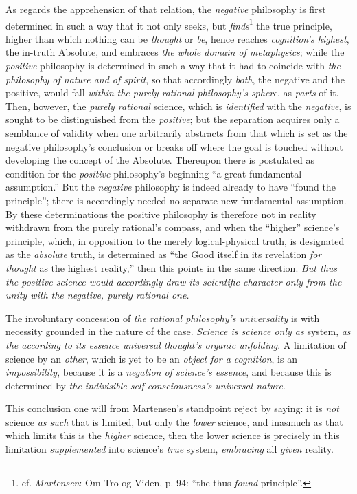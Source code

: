 \documentclass[12pt,a4paper]{book}
\begin{document}
As regards the apprehension of that relation, the \emph{negative} philosophy is first determined
in such a way that it not only seeks, but \emph{finds}\footnote{cf. \emph{Martensen}: Om Tro
og Viden, p. 94: ``the thus-\emph{found} principle''.} the true principle, higher than which
nothing can be \emph{thought} or \emph{be}, hence reaches \emph{cognition's highest}, the in-truth
Absolute, and embraces \emph{the whole domain of metaphysics}; while the \emph{positive}
philosophy is determined in such a way that it had to coincide with \emph{the philosophy of
nature and of spirit}, so that accordingly \emph{both}, the negative and the positive, would fall
\emph{within} \emph{the purely rational philosophy's sphere}, as \emph{parts} of it. Then, however, the
\emph{purely rational} science, which is \emph{identified} with the \emph{negative}, is sought to be
distinguished from the \emph{positive}; but the separation acquires only a semblance of
validity when one arbitrarily abstracts from that which is set as the negative philosophy's
conclusion or breaks off where the goal is touched without developing the concept of the
Absolute. Thereupon there is postulated as condition for the \emph{positive} philosophy's beginning
``a great fundamental assumption.'' But the \emph{negative} philosophy is indeed already to have
``found the principle''; there is accordingly needed no separate new fundamental assumption.
By these determinations the positive philosophy is therefore not in reality withdrawn from the
purely rational's compass, and when the ``higher'' science's principle, which, in opposition to
the merely logical-physical truth, is designated as the \emph{absolute} truth, is determined as ``the
Good itself in its revelation \emph{for thought} as the highest reality,'' then this points in the
same direction. \emph{But thus the positive science would accordingly draw its scientific
character only from the unity with the negative, purely rational one.}

The involuntary concession of \emph{the rational philosophy's universality} is with necessity
grounded in the nature of the case. \emph{Science is science only as} system, \emph{as the according
to its essence universal thought's organic unfolding}. A limitation of science by an \emph{other}, which
is yet to be an \emph{object for a cognition}, is an \emph{impossibility}, because it is a \emph{negation of
science's essence}, and because this is determined by \emph{the indivisible self-consciousness's
universal nature}.

This conclusion one will from Martensen's standpoint reject by saying: it is \emph{not} science \emph{as
such} that is limited, but only the \emph{lower} science, and inasmuch as that which limits this is the
\emph{higher} science, then the lower science is precisely in this limitation \emph{supplemented} into
science's \emph{true} system, \emph{embracing} all \emph{given} reality.
\end{document}
